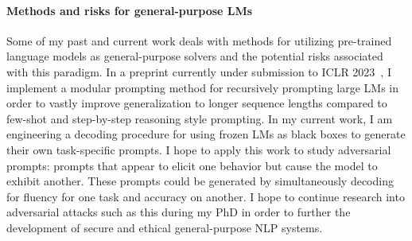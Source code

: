 \documentclass[11pt]{article}
\begin{document}
\paragraph{Methods and risks for general-purpose LMs}

Some of my past and current work 
deals with methods for utilizing pre-trained language models
as general-purpose solvers and the potential risks associated with this paradigm.
In a preprint currently under submission to ICLR 2023~\cite{Khot2022DecomposedPA},
I implement a modular prompting method for recursively prompting large LMs 
in order to vastly improve generalization to longer sequence lengths
compared to few-shot and step-by-step reasoning style prompting.
In my current work, I am engineering a
decoding procedure for using frozen LMs as black boxes
to generate their own task-specific prompts.
I hope to apply this work
to study adversarial prompts:
prompts that appear to elicit one behavior 
but cause the model to exhibit another.
These prompts could be generated by simultaneously 
decoding for fluency for one task and accuracy on another.
I hope to continue research into adversarial attacks such as this 
during my PhD in order to
further the development of secure and ethical general-purpose NLP systems. 
\end{document}
